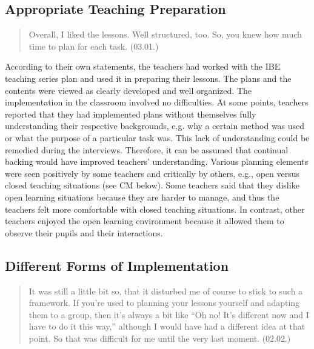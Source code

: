 \documentclass[11.5pt]{sig-alternate} %
\begin{document}
\begin{large}
\subsection*{Appropriate Teaching Preparation}

\begin{quote}
    Overall, I liked the lessons. Well structured, too. So, you knew how much time to plan for each task. (03.01.)
\end{quote}

According to their own statements, the teachers had worked with the IBE teaching series plan and used it in preparing their lessons. The plans and the contents were viewed as clearly developed and well organized. The implementation in the classroom involved no difficulties. At some points, teachers reported that they had implemented plans without themselves fully understanding their respective backgrounds, e.g. why a certain method was used or what the purpose of a particular task was. This lack of understanding could be remedied during the interviews. Therefore, it can be assumed that continual backing would have improved teachers’ understanding. Various planning elements were seen positively by some teachers and critically by others, e.g., open versus closed teaching situations (see CM below). Some teachers said that they dislike open learning situations because they are harder to manage, and thus the teachers felt more comfortable with closed teaching situations. In contrast, other teachers enjoyed the open learning environment because it allowed them to observe their pupils and their interactions.

\subsection*{Different Forms of Implementation}

\begin{quote}
    It was still a little bit so, that it disturbed me of course to stick to such a framework. If you’re used to planning your lessons yourself and adapting them to a group, then it’s always a bit like “Oh no! It's different now and I have to do it this way,” although I would have had a different idea at that point. So that was difficult for me until the very last moment. (02.02.)
\end{quote}


\end{large}
\end{document}
